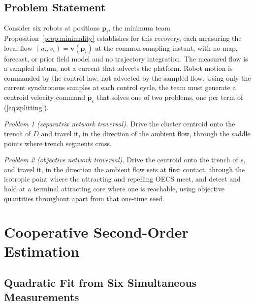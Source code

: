 \documentclass[lettersize,journal]{IEEEtran}
\begin{document}
\subsection{Problem Statement}
\label{sec:problem_statement}

Consider six robots at positions $\mathbf{p}_i$, the minimum team
Proposition~\ref{prop:minimality} establishes for this recovery, each
measuring the local flow $(u_i, v_i) = \mathbf{v}(\mathbf{p}_i)$ at the
common sampling instant, with no map, forecast, or prior field model and no
trajectory integration. The measured flow is a sampled datum, not a
current that advects the platform. Robot motion is commanded by the
control law, not advected by the sampled flow. Using
only the current synchronous samples at
each control cycle, the team must generate a centroid velocity command
$\dot{\mathbf{p}}_c$ that solves one of two problems, one per term of
(\ref{eq:splitting}).

\emph{Problem 1 (separatrix network traversal).} Drive the cluster
centroid onto the trench of $D$ and travel it, in the direction of the
ambient flow, through the saddle points where trench segments cross.

\emph{Problem 2 (objective network traversal).} Drive the centroid onto
the trench of $s_1$ and travel it, in the direction the ambient flow
sets at first contact, through the isotropic point where the
attracting and repelling OECS meet, and detect and hold at a terminal
attracting core where one is reachable, using objective quantities
throughout apart from that one-time seed.


\section{Cooperative Second-Order Estimation}
\label{sec:estimation}

\subsection{Quadratic Fit from Six Simultaneous Measurements}
\end{document}
